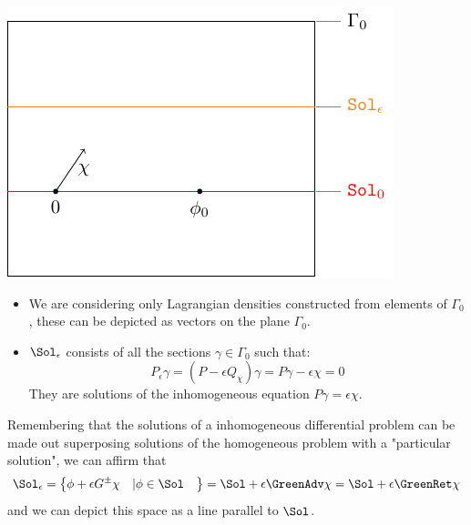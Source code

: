 \documentclass[Main]{subfiles}
\begin{document}
		\vspace{1mm}		
		\begin{minipage}{0.5\textwidth}
			\includegraphics[width=\textwidth]{Pictures/compsupp_GeometricPicture1}
		\end{minipage}
		\begin{minipage}{0.5\textwidth}
			\begin{itemize}
				\item  We are considering only Lagrangian densities constructed from elements of $\Gamma_0$, these can be depicted as vectors on the plane $\Gamma_0$.
				\item 	$\Sol_\epsilon$ consists of all the sections $\gamma \in \Gamma_0$ such that:
					\begin{displaymath}
						P_\epsilon \gamma = ( P  - \epsilon Q_\chi) \gamma = P \gamma - \epsilon \chi = 0
					\end{displaymath}
					They are solutions of the inhomogeneous equation $P \gamma = \epsilon \chi$.
			\end{itemize}
		\end{minipage}
		\vspace{1mm}
		
		Remembering that the solutions of a inhomogeneous differential problem can be made out superposing solutions of the homogeneous problem with a "particular solution", 
		we can affirm that
		\begin{displaymath}
			\Sol_\epsilon = \left\lbrace \phi + \epsilon G^\pm \chi \quad \vert \phi \in \Sol \quad  \right\rbrace =
			 \Sol + \epsilon \GreenAdv \chi = \Sol + \epsilon \GreenRet \chi
		\end{displaymath}
		and we can depict this space as a line parallel to $\Sol$.
\end{document}
